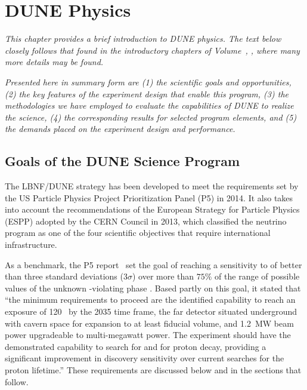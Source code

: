 \chapter{DUNE Physics}
\label{ch:exec-phys}


\textit{
This chapter provides a brief introduction to DUNE physics.  The text below closely follows that found in the introductory chapters of Volume~\volnumberphysics{}, \voltitlephysics{}, where many more details may be found.}

\textit{Presented here in summary form are   
(1) the scientific goals and opportunities, 
(2) the key features of the experiment 
design that enable this program, 
(3) the methodologies we have 
employed to evaluate the capabilities of DUNE to realize 
the science, 
(4) the corresponding results for selected program elements, 
and (5) the demands placed on the experiment design and 
performance.
}  %

\section{Goals of the DUNE Science Program}
\label{sec:exec-phys-key-goals}

The LBNF/DUNE strategy has been developed to meet the
requirements set by the US Particle Physics Project Prioritization Panel
(P5) in 2014. It also takes into account the recommendations
of the European Strategy for Particle Physics (ESPP) adopted
by the CERN Council in 2013, which classified the 
neutrino program as one of the four scientific objectives that
require international infrastructure.

As a benchmark, the P5 report~\cite{p5report2014} set the goal of
reaching a sensitivity to  of better than three
standard deviations (\num{3}$\sigma$) over more than $75\%$
of the range of possible values of the unknown
-violating phase \deltacp.
Based partly on this goal, it stated that ``the
minimum requirements to proceed are the identified capability
to reach an exposure of \num{120}~\ktMWyr{} by the 2035 time
frame, the far detector situated underground with cavern space
for expansion to at least \fdfiducialmass \lar fiducial volume,
and \SI{1.2}{MW} beam power upgradeable to multi-megawatt power.
The experiment should have the demonstrated capability to
search for  and for proton decay, providing a
significant improvement in discovery sensitivity over current
searches for the proton lifetime.''
These requirements are discussed below and in the sections
that follow.

